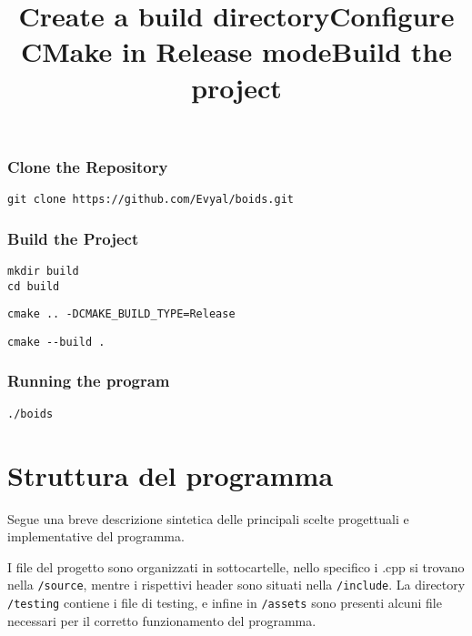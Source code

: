 \documentclass[10pt,a4paper]{article}
\begin{document}

\subsubsection{Clone the Repository}

\begin{lstlisting}
git clone https://github.com/Evyal/boids.git
\end{lstlisting}

\subsubsection{Build the Project}

    
\title{\textbf{Create a build directory}}

\begin{lstlisting}
mkdir build
cd build
\end{lstlisting}

\title{\textbf{Configure CMake in Release mode}}

\begin{lstlisting}
cmake .. -DCMAKE_BUILD_TYPE=Release
\end{lstlisting}

\title{\textbf{Build the project}} 

\begin{lstlisting}
cmake --build .
\end{lstlisting}

\subsubsection{Running the program} 

\begin{lstlisting}
./boids
\end{lstlisting}

\newpage

\section{Struttura del programma}
Segue una breve descrizione sintetica delle principali scelte progettuali e implementative del programma.


I file del progetto sono organizzati in sottocartelle, nello specifico i .cpp si trovano nella \texttt{/source}, mentre i rispettivi header sono situati nella \texttt{/include}. La directory \texttt{/testing} contiene i file di testing, e infine in \texttt{/assets} sono presenti alcuni file necessari per il corretto funzionamento del programma. 
\end{document}
